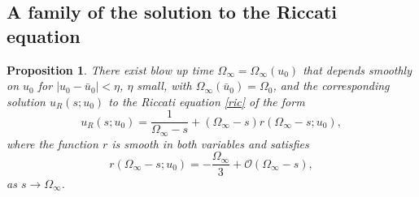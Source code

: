\documentclass[letterpaper,11pt]{article}
\newcommand{\rmO}{\mathcal{O}}
\numberwithin{equation}{section}
\theoremstyle{plain}
\newtheorem{proposition}[theorem]{Proposition}
\begin{document}
\subsection{A family of the solution to the Riccati equation }
\begin{proposition}\label{para_ric}
There exist blow up time $\Omega_\infty = \Omega_\infty(u_0)$ that depends smoothly on $u_0$ for $|u_0 - \bar{u}_0|<\eta$, $\eta$ small, with $\Omega_\infty(\bar{u}_0) = \Omega_0$, and the corresponding solution $u_R(s; u_0)$ to the Riccati equation \eqref{ric} of the form
\begin{equation}\label{ric_exp}
u_R(s;u_0) = \frac{1}{\Omega_\infty-s} +  (\Omega_\infty-s) r(\Omega_\infty-s;u_0),
\end{equation}
where the function $r$ is smooth in both variables and satisfies
\begin{equation}\label{ric_reminder}
r( \Omega_\infty-s; u_0) = -\frac{\Omega_\infty}{3} + \rmO(\Omega_\infty-s),
\end{equation}
as $s \to \Omega_\infty$.
\end{proposition}
\end{document}
